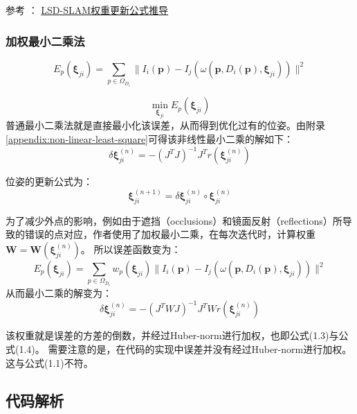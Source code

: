 参考 ： \href{https://zhuanlan.zhihu.com/p/54129298}{LSD-SLAM权重更新公式推导}




\subsubsection{加权最小二乘法}


\begin{equation}
E_p(\bm{\xi}_{ji}) = \sum_{p \in \Omega_{D_i}}\| I_i(\bm{p}) - I_j(\omega(\bm{p}, D_i(\bm{p}), \bm{\xi}_{ji}))  \|^2
\end{equation}

\begin{equation}
	\min_{\bm{\xi}_{ji}} E_p(\bm{\xi}_{ji})
\end{equation}
普通最小二乘法就是直接最小化该误差，从而得到优化过有的位姿。由附录\ref{appendix:non-linear-least-square}可得该非线性最小二乘的解如下：
\begin{equation}
	\delta \bm{\xi}_{ji}^{(n)} = -(J^TJ)^{-1} J^Tr(\bm{\xi}_{ji}^{(n)})
\end{equation}

位姿的更新公式为：
\begin{equation}
	\bm{\xi}_{ji}^{(n+1)} = \delta \bm{\xi}_{ji}^{(n)} \circ \bm{\xi}_{ji}^{(n)}
\end{equation}




为了减少外点的影响，例如由于遮挡（occlusions）和镜面反射（reflections）所导致的错误的点对应，作者使用了加权最小二乘，在每次迭代时，计算权重$\bm{W}=\bm{W}(\bm{\xi}_{ji}^{(n)})$。
所以误差函数变为：
\begin{equation}
	E_p(\bm{\xi}_{ji}) = \sum_{p \in \Omega_{D_i}} w_p(\bm{\xi}_{ji}) \| I_i(\bm{p}) - I_j(\omega(\bm{p}, D_i(\bm{p}), \bm{\xi}_{ji}))  \|^2
\end{equation}
从而最小二乘的解变为：
\begin{equation}
		\delta \bm{\xi}_{ji}^{(n)} = -(J^TWJ)^{-1} J^TWr(\bm{\xi}_{ji}^{(n)})
\end{equation}

该权重就是误差的方差的倒数，并经过Huber-norm进行加权，也即公式(1.3)与公式(1.4)。
需要注意的是，在代码的实现中误差并没有经过Huber-norm进行加权。这与公式(1.1)不符。

\subsection{代码解析}




